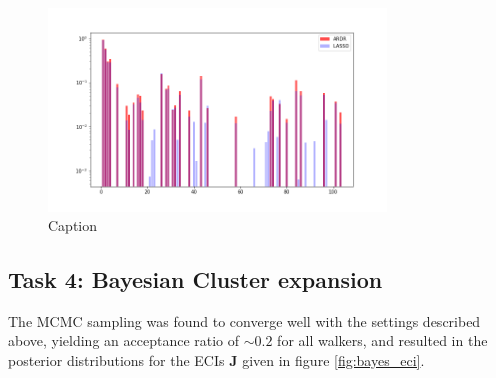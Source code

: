\documentclass[11pt,a4paper]{article}
\begin{document}
\begin{figure}[H]
    \centering
    \includegraphics[width = 0.8\textwidth]{figures/lasso_ardr_weights_overlap.png}
    \caption{Caption}
    \label{fig:weights_overlap}
\end{figure}

\subsection[Task 2]{Task 4: Bayesian Cluster expansion}

The MCMC sampling was found to converge well with the settings described above, yielding an acceptance ratio of $\sim 0.2$ for all walkers, and resulted in the posterior distributions for the ECIs $\mathbf{J}$ given in figure \ref{fig:bayes_eci}.
\end{document}

